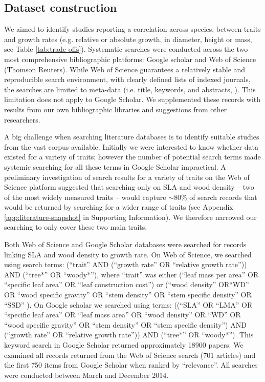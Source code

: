\documentclass[a4paper,11pt]{article}
\begin{document}
\subsection*{Dataset construction}\label{data-construction}

We aimed to identify studies reporting a correlation across species, between traits and growth rates (e.g. relative or absolute growth, in diameter, height or mass, see Table \ref{tab:trade-offs}). Systematic searches were conducted across the two most comprehensive bibliographic platforms: Google scholar and Web of Science (Thomson Reuters). While Web of Science guarantees a relatively stable and reproducible search environment, with clearly defined lists of indexed journals, the searches are limited to meta-data (i.e. title, keywords, and abstracts, \citealt{Beckmann:2012hn}). This limitation does not apply to Google Scholar. We supplemented these records with results from our own bibliographic libraries and suggestions from other researchers.

A big challenge when searching literature databases is to identify suitable studies from the vast corpus available. Initially we were interested to know whether data existed for a variety of traits; however the number of potential search terms made systemic searching for all these terms in Google Scholar impractical. A preliminary investigation of search results for a variety of traits on the Web of Science platform suggested that searching only on SLA and wood density -- two of the most widely measured traits -- would capture $\sim$80\% of search records that would be returned by searching for a wider range of traits (see Appendix \ref{app:literature-snapshot} in Supporting Information). We therefore narrowed our searching to only cover these two main traits.

Both Web of Science and Google Scholar databases were searched for records linking SLA and wood density to growth rate. On Web of Science, we searched using  search terms: (``trait'' AND (``growth rate'' OR ``relative growth rate'')) AND (``tree*'' OR ``woody*''), where ``trait'' was either (``leaf mass per area'' OR ``specific leaf area'' OR ``leaf construction cost'') or (``wood density'' OR``WD'' OR ``wood specific gravity'' OR ``stem density'' OR ``stem specific density'' OR ``SSD'' ). On Google scholar we searched using terms: ((``SLA'' OR ``LMA'' OR ``specific leaf area'' OR ``leaf mass area'' OR ``wood density'' OR ``WD'' OR ``wood specific gravity'' OR ``stem density'' OR ``stem specific density'') AND (``growth rate'' OR ``relative growth rate'')) AND (``tree*'' OR ``woody*''). This keyword search in Google Scholar returned approximately 18900 papers. We examined all records returned from the Web of Science search (701 articles) and the first 750 items from Google Scholar when ranked by ``relevance''. All searches were conducted between March and December 2014.
\end{document}
